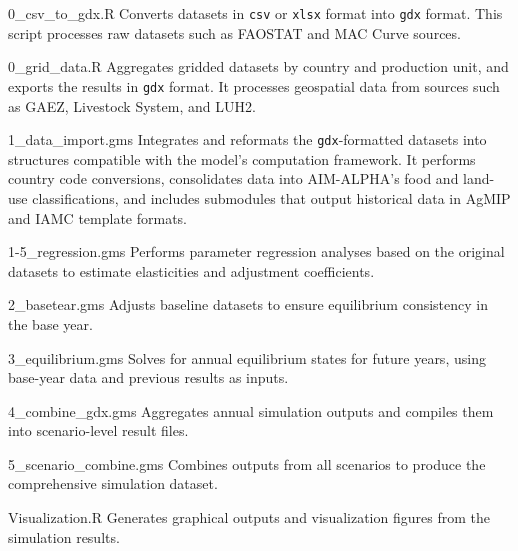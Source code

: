 \begin{programbox}{0\_csv\_to\_gdx.R}
Converts datasets in \texttt{csv} or \texttt{xlsx} format into \texttt{gdx} format.  
This script processes raw datasets such as FAOSTAT and MAC Curve sources.
\end{programbox}

\begin{programbox}{0\_grid\_data.R}
Aggregates gridded datasets by country and production unit, and exports the results in \texttt{gdx} format.  
It processes geospatial data from sources such as GAEZ, Livestock System, and LUH2.
\end{programbox}

\begin{programbox}{1\_data\_import.gms}
Integrates and reformats the \texttt{gdx}-formatted datasets into structures compatible with the model’s computation framework.  
It performs country code conversions, consolidates data into AIM-ALPHA’s food and land-use classifications,  
and includes submodules that output historical data in AgMIP and IAMC template formats.
\end{programbox}

\begin{programbox}{1-5\_regression.gms}
Performs parameter regression analyses based on the original datasets to estimate elasticities and adjustment coefficients.
\end{programbox}

\begin{programbox}{2\_basetear.gms}
Adjusts baseline datasets to ensure equilibrium consistency in the base year.
\end{programbox}

\begin{programbox}{3\_equilibrium.gms}
Solves for annual equilibrium states for future years, using base-year data and previous results as inputs.
\end{programbox}

\begin{programbox}{4\_combine\_gdx.gms}
Aggregates annual simulation outputs and compiles them into scenario-level result files.
\end{programbox}

\begin{programbox}{5\_scenario\_combine.gms}
Combines outputs from all scenarios to produce the comprehensive simulation dataset.
\end{programbox}

\begin{programbox}{Visualization.R}
Generates graphical outputs and visualization figures from the simulation results.
\end{programbox}

